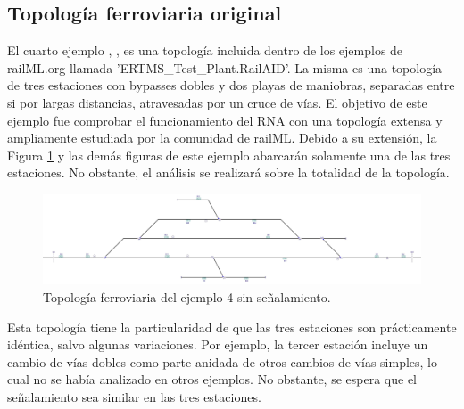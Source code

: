 \subsection{Topología ferroviaria original}
	
	El cuarto ejemplo , , es una topología incluida dentro de los ejemplos de railML.org llamada 'ERTMS\_Test\_Plant.RailAID'. La misma es una topología de tres estaciones con bypasses dobles y dos playas de maniobras, separadas entre si por largas distancias, atravesadas por un cruce de vías. El objetivo de este ejemplo fue comprobar el funcionamiento del RNA con una topología extensa y ampliamente estudiada por la comunidad de railML. Debido a su extensión, la Figura \ref{fig:EJ4_1} y las demás figuras de este ejemplo abarcarán solamente una de las tres estaciones. No obstante, el análisis se realizará sobre la totalidad de la topología.
	
	\begin{figure}[h]
		\centering
		\includegraphics[width=1\textwidth]{resultados-obtenidos/ejemplo4/images/4_empty.png}
		\centering\caption{Topología ferroviaria del ejemplo 4 sin señalamiento.}
		\label{fig:EJ4_1}
	\end{figure}
	
	Esta topología tiene la particularidad de que las tres estaciones son prácticamente idéntica, salvo algunas variaciones. Por ejemplo, la tercer estación incluye un cambio de vías dobles como parte anidada de otros cambios de vías simples, lo cual no se había analizado en otros ejemplos. No obstante, se espera que el señalamiento sea similar en las tres estaciones.
